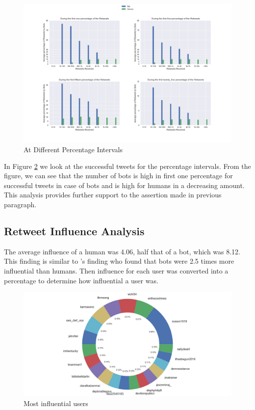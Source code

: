 \documentclass[letterpaper]{article}
\begin{document}
\begin{figure}[H]
    \includegraphics[width=\linewidth]{images/bot_humans_retweet_percentages.png}
    \caption{At Different Percentage Intervals}
    \label{fig:humans_bots_percentage}
\end{figure}

In Figure \ref{fig:humans_bots_percentage} we look at the successful tweets for the percentage intervals.
From the figure, we can see that the number of bots is high in first one percentage for successful tweets in case of bots and is high for humans in a decreasing amount.
This analysis provides further support to the assertion made in previous paragraph.

\subsection{Retweet Influence Analysis}

The average influence of a human was 4.06, half that of a bot, which was 8.12. This finding is similar to 
\cite{rizoiu2018debatenight}'s finding who found that bots were 2.5 times more influential than humans. Then influence for each user was converted 
into a percentage to determine how influential a user was. 

\begin{figure}[h!]
    \includegraphics[width=\linewidth]{images/top_influences.png}
    \caption{Most influential users}
    \label{fig:humans_bots_percentage}
\end{figure}
\end{document}
